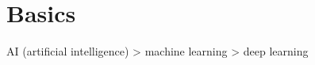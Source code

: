 
\chapter{Basics}
\label{cha:basics}

AI (artificial intelligence) > machine learning > deep learning



